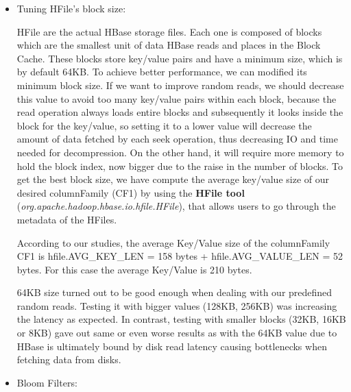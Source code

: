 \begin{itemize}
\item Tuning HFile's block size:
\par
HFile are the actual HBase storage files. Each one is composed of blocks which are the smallest unit of data HBase reads and places in the Block Cache. These blocks store key/value pairs and have a minimum size, which is by default 64KB. To achieve better performance, we can modified its minimum block size. If we want to improve random reads, we should decrease this value to avoid too many key/value pairs within each block, because the read operation always loads entire blocks and subsequently it looks inside the block for the key/value, so setting it to a lower value will decrease the amount of data fetched by each seek operation, thus decreasing IO and time needed for decompression. On the other hand, it will require more memory to hold the block index, now bigger due to the raise in the number of blocks.
\bigskip
To get the best block size, we have compute the average key/value size of our desired columnFamily (CF1) by using the \textbf{HFile tool} (\textit{org.apache.hadoop.hbase.io.hfile.HFile}), that allows users to go through the metadata of the HFiles. 
\par
According to our studies, the average Key/Value size of the columnFamily CF1 is hfile.AVG\_KEY\_LEN = 158 bytes + hfile.AVG\_VALUE\_LEN = 52 bytes. For this case the average Key/Value is 210 bytes.
\par
64KB size turned out to be good enough when dealing with our predefined random reads. Testing it with bigger values (128KB, 256KB) was increasing the latency as expected. In contrast, testing with smaller blocks (32KB, 16KB or 8KB) gave out same or even worse results as with the 64KB value due to HBase is ultimately bound by disk read latency causing bottlenecks when fetching data from disks.


\item Bloom Filters:


\end{itemize}
